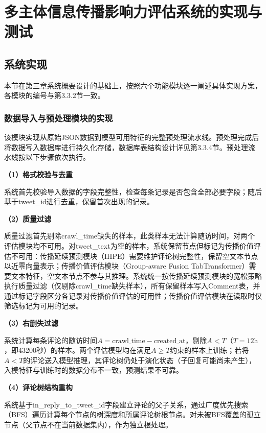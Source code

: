 \chapter{多主体信息传播影响力评估系统的实现与测试}

\section{系统实现}

\setlength{\textfloatsep}{0.4\baselineskip}
\setlength{\intextsep}{0.4\baselineskip}

本节在第三章系统概要设计的基础上，按照六个功能模块逐一阐述具体实现方案，各模块的编号与第3.3.2节一致。

\subsection{数据导入与预处理模块的实现}

该模块实现从原始JSON数据到模型可用特征的完整预处理流水线。预处理完成后将数据写入数据库进行持久化存储，数据库表结构设计详见第3.3.4节。预处理流水线按以下步骤依次执行。

\textbf{（1）格式校验与去重}

系统首先校验导入数据的字段完整性，检查每条记录是否包含全部必要字段；随后基于tweet\_id进行去重，保留首次出现的记录。

\textbf{（2）质量过滤}

质量过滤首先剔除crawl\_time缺失的样本，此类样本无法计算随访时间，对两个评估模块均不可用。对tweet\_text为空的样本，系统保留节点但标记为传播价值评估不可用：传播延续预测模块（IHPE）需要维护评论树完整性，保留空文本节点以近零向量表示；传播价值评估模块（Group-aware Fusion TabTransformer）需要文本特征，空文本节点不参与其推理。系统统一按传播延续预测模块的宽松策略执行质量过滤（仅剔除crawl\_time缺失样本），所有保留样本写入Comment表，并通过标记字段区分各记录对传播价值评估的可用性；传播价值评估模块在读取时仅筛选标记为可用的记录。

\textbf{（3）右删失过滤}

系统计算每条评论的随访时间$A = \text{crawl\_time} - \text{created\_at}$，剔除$A < T$（$T=12\text{h}$，即43200秒）的样本。两个评估模型均在满足$A \geq T$约束的样本上训练；若将$A < T$的评论送入模型推理，其评论树仍处于演化状态（子回复可能尚未产生），入模特征与训练时的数据分布不一致，预测结果不可靠。

\textbf{（4）评论树结构重构}

系统基于in\_reply\_to\_tweet\_id字段建立评论的父子关系，通过广度优先搜索（BFS）遍历计算每个节点的树深度和所属评论树根节点。对未被BFS覆盖的孤立节点（父节点不在当前数据集内），作为独立根处理。

